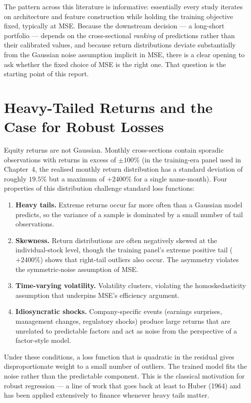 The pattern across this literature is informative: essentially every study iterates on architecture and feature construction while holding the training objective fixed, typically at MSE. Because the downstream decision --- a long-short portfolio --- depends on the cross-sectional \textit{ranking} of predictions rather than their calibrated values, and because return distributions deviate substantially from the Gaussian noise assumption implicit in MSE, there is a clear opening to ask whether the fixed choice of MSE is the right one. That question is the starting point of this report.

\section{Heavy-Tailed Returns and the Case for Robust Losses}\label{sec:heavy_tailed_returns}

Equity returns are not Gaussian. Monthly cross-sections contain sporadic observations with returns in excess of $\pm 100\%$ (in the training-era panel used in Chapter~4, the realised monthly return distribution has a standard deviation of roughly $19.5\%$ but a maximum of $+2400\%$ for a single name-month). Four properties of this distribution challenge standard loss functions:

\begin{enumerate}
 \item \textbf{Heavy tails.} Extreme returns occur far more often than a Gaussian model predicts, so the variance of a sample is dominated by a small number of tail observations.
 \item \textbf{Skewness.} Return distributions are often negatively skewed at the individual-stock level, though the training panel's extreme positive tail ($+2400\%$) shows that right-tail outliers also occur. The asymmetry violates the symmetric-noise assumption of MSE.
 \item \textbf{Time-varying volatility.} Volatility clusters, violating the homoskedasticity assumption that underpins MSE's efficiency argument.
 \item \textbf{Idiosyncratic shocks.} Company-specific events (earnings surprises, management changes, regulatory shocks) produce large returns that are unrelated to predictable factors and act as noise from the perspective of a factor-style model.
\end{enumerate}

Under these conditions, a loss function that is quadratic in the residual gives disproportionate weight to a small number of outliers. The trained model fits the noise rather than the predictable component. This is the classical motivation for robust regression --- a line of work that goes back at least to Huber (1964) \cite{refA1} and has been applied extensively to finance whenever heavy tails matter.

